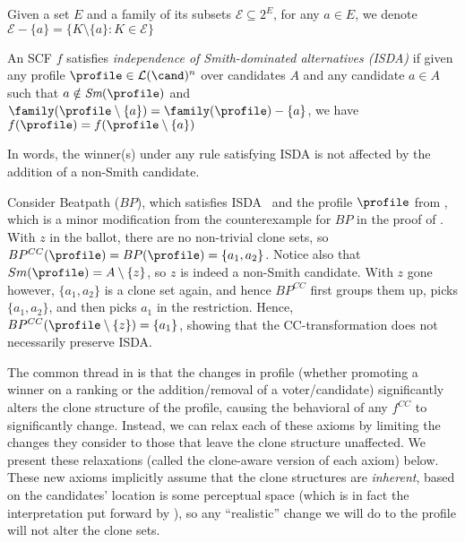     Given a set $E$ and a family of its subsets $\mathcal{E} \subseteq 2^E$, for any $a \in E$, we denote $\mathcal{E}-\{a\} = \{K \setminus \{a\}: K \in \mathcal{E}\}$ 

\begin{definition}\label{appdef:isda}
    An SCF $f$ satisfies \emph{independence of Smith-dominated alternatives (ISDA)} if given any profile $\profile \in \mathcal{L}(\cand)^n$ over candidates $A$ and any candidate $a\in A$ such that $a \notin \textit{Sm}(\profile)$ and $\family(\profile \setminus\{a\}) = \family(\profile) - \{a\}$, we have $f(\profile)=f(\profile \setminus \{a\})$
\end{definition}

In words, the winner(s) under any rule satisfying ISDA is not affected by the addition of a non-Smith candidate.

\begin{example}\label{ex:counter-isda}
 Consider Beatpath ($BP$), which satisfies ISDA~\citep{Schulze10:New} and the profile $\profile$ from , which is a minor modification from the counterexample for $BP$ in the proof of . With $z$ in the ballot, there are no non-trivial clone sets, so $BP^{CC}(\profile)=BP(\profile)=\{a_1,a_2\}$. Notice also that $Sm(\profile)=A \setminus\{z\}$, so $z$ is indeed a non-Smith candidate. With $z$ gone however, $\{a_1,a_2\}$ is a clone set again, and hence $BP^{CC}$ first groups them up, picks $\{a_1,a_2\}$, and then picks $a_1$ in the restriction. Hence, $BP^{CC}(\profile \setminus\{z\}) =\{a_1\}$, showing that the CC-transformation does not necessarily preserve ISDA.
\end{example}

The common thread in  is that the changes in profile (whether promoting a winner on a ranking or the addition/removal of a voter/candidate) significantly alters the clone structure of the profile, causing the behavioral of any $f^{CC}$ to significantly change. Instead, we can relax each of these axioms by limiting the changes they consider to those that leave the clone structure unaffected. We present these relaxations (called the clone-aware version of each axiom) below. These new axioms implicitly assume that the clone structures are \textit{inherent}, based on the candidates' location is some perceptual space (which is in fact the interpretation put forward by \citet{Tideman87:Independence}), so any ``realistic'' change we will do to the profile will not alter the clone sets. 


